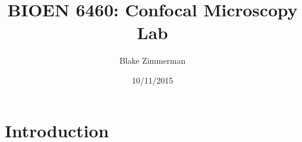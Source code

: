 \documentclass[11pt]{article}
\title{BIOEN 6460: Confocal Microscopy Lab}
\author{Blake Zimmerman}
\date{10/11/2015 }
\begin{document}
	
\maketitle
	
\tableofcontents
	
\maketitle
	
	
\section{Introduction}
\end{document}
